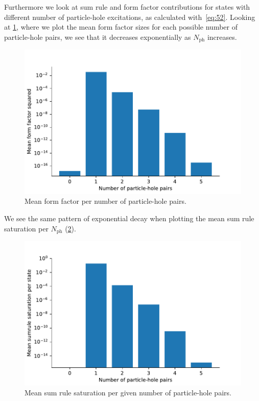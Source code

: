 \documentclass[11pt, a4paper]{report} %
\begin{document}
Furthermore we look at sum rule and form factor contributions for states with different number of particle-hole excitations, as calculated with~\cref{eq:52}.
Looking at \cref{fig:meanffphpairs}, where we plot the mean form factor sizes for each possible number of particle-hole pairs, we see that it decreases exponentially as \(N_{\mathrm{ph}}\) increases.
\begin{figure}[tb!]
  \centering
  \includegraphics[width=.7\textwidth]{ave_form_factor_ph_pairs.pdf}
  \caption{Mean form factor per number of particle-hole pairs.}\label{fig:meanffphpairs}
\end{figure}
We see the same pattern of exponential decay when plotting the mean sum rule saturation per \(N_{\mathrm{ph}}\) (\cref{fig:meansumrulesaturation}). 
\begin{figure}[tb!]
  \centering
  \includegraphics[width=.7\textwidth]{ave_sum_rule_saturation_ph_pairs.pdf}
  \caption{Mean sum rule saturation per given number of particle-hole pairs.}\label{fig:meansumrulesaturation}
\end{figure}
\end{document}

